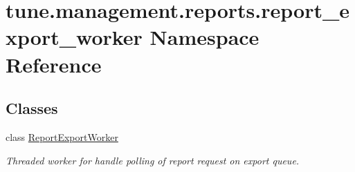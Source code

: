 \hypertarget{namespacetune_1_1management_1_1reports_1_1report__export__worker}{\section{tune.\-management.\-reports.\-report\-\_\-export\-\_\-worker Namespace Reference}
\label{namespacetune_1_1management_1_1reports_1_1report__export__worker}
}
\subsection*{Classes}
\begin{DoxyCompactItemize}
\item 
class \hyperlink{classtune_1_1management_1_1reports_1_1report__export__worker_1_1ReportExportWorker}{Report\-Export\-Worker}
\begin{DoxyCompactList}\small\item\em Threaded worker for handle polling of report request on export queue. \end{DoxyCompactList}\end{DoxyCompactItemize}
